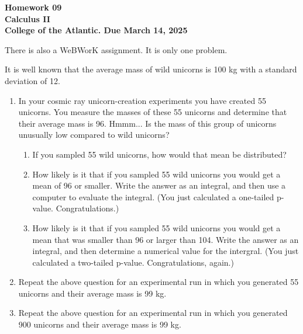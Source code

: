 \documentclass[12pt]{extarticle}
\begin{document}
\pagestyle{empty}
\begin{center}
  {\Large {\bf Homework 09}}\\
\medskip
{\large {\bf Calculus II}}\\
\medskip
{\bf College of the Atlantic. Due March 14, 2025}\\
\end{center}

\medskip

There is also a WeBWorK assignment. It is only one problem. 

It is well known that the average mass of wild unicorns is 100 kg with 
a standard deviation of 12. 

\begin{enumerate}
\setlength{\itemsep}{3mm}
\item In your cosmic ray unicorn-creation
experiments you have created 55 unicorns. You measure the masses of
these 55 unicorns and determine that their average mass is 96. 
Hmmm... Is the mass of this group of unicorns unusually low compared
to wild unicorns? 
\begin{enumerate}
  \item If you sampled 55 wild unicorns, how would that mean be
    distributed?
  \item How likely is it that if you sampled 55 wild unicorns you
    would get a mean of 96 or smaller. Write the answer as an
    integral, and then use a computer to evaluate the integral. (You
    just calculated a one-tailed p-value. Congratulations.)
  \item How likely is it that if you sampled 55 wild unicorns you
        would get a mean that was smaller than 96 or larger than
        104. Write the answer as an integral, and then determine a
        numerical value for the intergral.  (You just calculated a
        two-tailed p-value. Congratulations, again.)
\end{enumerate}


\item Repeat the above question for an experimental run in which you
  generated 55 unicorns and their average mass is 99 kg.
  
\item Repeat the above question for an experimental run in which you
  generated 900 unicorns and their average mass is 99 kg.

\end{enumerate}
\end{document}
